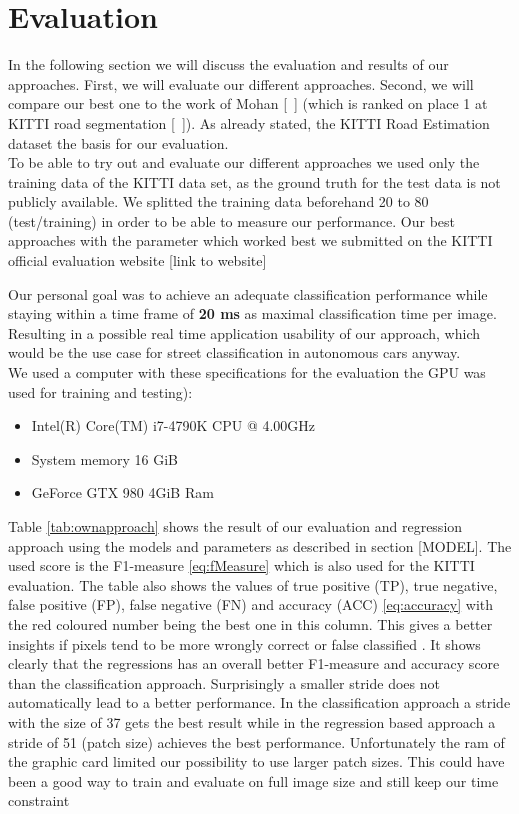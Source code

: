 
\section{Evaluation}\label{sec:evaluation}

In the following section we will discuss the evaluation and results of our approaches. First, we will evaluate our different approaches. Second, we will compare our best one to the work of Mohan [~\cite{Tarel2009}]  (which is ranked on place 1 at KITTI road segmentation [~\cite{Tarel2009}]).
As already stated, the KITTI Road Estimation dataset the basis for our evaluation.\\
To be able to try out and evaluate our different approaches we used only the training data of the KITTI data set, as the ground truth for the test data is not publicly available. We splitted the training data beforehand 20 to 80 (test/training) in order to be able to measure our performance. 
Our best approaches with the parameter which worked best we submitted on the KITTI official evaluation website [link to website]


Our personal goal was to achieve an adequate classification performance while staying within a time frame of \textbf{20 ms} as maximal classification time per image. Resulting in a possible real time application usability of our approach, which would be the use case for street classification in autonomous cars anyway.\\

We used a computer with these specifications for the evaluation the GPU was used for training and testing):
\begin{itemize}
\item Intel(R) Core(TM) i7-4790K CPU @ 4.00GHz
\item System memory 16 GiB
\item GeForce GTX 980 4GiB Ram
\end{itemize}

Table \ref{tab:ownapproach} shows the result of our evaluation and regression approach using the models and parameters as described in section [MODEL]. The used score is the F1-measure \ref{eq:fMeasure} which is also used for the KITTI evaluation.
The table also shows the values of true positive (TP), true negative, false positive (FP), false negative (FN) and accuracy (ACC) \ref{eq:accuracy} with the red coloured number being the best one in this column. This gives a better insights if pixels tend to be more wrongly correct or false classified . It shows clearly that the regressions has an overall better F1-measure and accuracy score than the classification approach. Surprisingly a smaller stride does not automatically lead to a better performance. In the classification approach a stride with the size of 37 gets the best result while in the regression based approach a stride of 51 (patch size) achieves the best performance. Unfortunately the ram of the graphic card limited our possibility to use larger patch sizes. This could have been a good way to train and evaluate on full image size and still keep our time constraint\\


